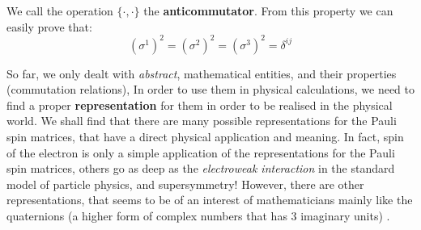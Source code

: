 We call the operation $ \{ \cdot,\cdot\}$ the \textbf{anticommutator}. From this property we can easily prove that:
\begin{equation}
(\sigma^1) ^2 = (\sigma^2) ^2 = (\sigma^3) ^2 = \delta ^{ij}
\end{equation}
\par 
So far, we only dealt with \textit{abstract}, mathematical entities, and their properties (commutation relations), In order to use them in physical calculations, we need to find a proper \textbf{representation} for them in order to be realised in the physical world. We shall find that there are many possible representations for the Pauli spin matrices, that have a direct physical application and meaning. In fact, spin of the electron is only a simple application of the representations for the Pauli spin matrices, others go as deep as the \textit{electroweak interaction } in the standard model of particle physics, and supersymmetry! However, there are other representations, that seems to be of an interest of mathematicians mainly like the quaternions (a higher form of complex numbers that has 3 imaginary units)  .
